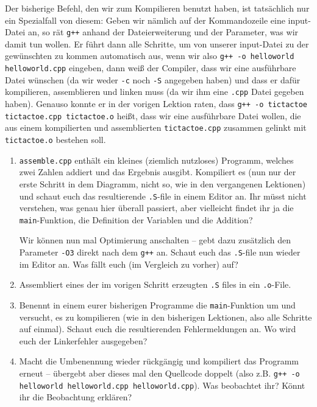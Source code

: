 Der bisherige Befehl, den wir zum Kompilieren benutzt haben, ist tatsächlich
nur ein Spezialfall von diesem: Geben wir nämlich auf der Kommandozeile eine
input-Datei an, so rät \texttt{g++} anhand der Dateierweiterung und der
Parameter, was wir damit tun wollen. Er führt dann alle Schritte, um von
unserer input-Datei zu der gewünschten zu kommen automatisch aus, wenn wir also
\texttt{g++ -o helloworld helloworld.cpp} eingeben, dann weiß der Compiler,
dass wir eine ausführbare Datei wünschen (da wir weder \texttt{-c} noch
\texttt{-S} angegeben haben) und dass er dafür kompilieren, assemblieren und
linken muss (da wir ihm eine \texttt{.cpp} Datei gegeben haben). Genauso konnte
er in der vorigen Lektion raten, dass \texttt{g++ -o tictactoe tictactoe.cpp
    tictactoe.o} heißt, dass wir eine ausführbare Datei wollen, die aus einem
kompilierten und assemblierten \texttt{tictactoe.cpp} zusammen gelinkt mit
\texttt{tictactoe.o} bestehen soll.

\begin{praxis}
    \begin{enumerate}
        \item \texttt{assemble.cpp} enthält ein kleines (ziemlich nutzloses)
              Programm, welches zwei Zahlen addiert und das Ergebnis ausgibt.
              Kompiliert es (nun nur der erste Schritt in dem Diagramm, nicht so, wie
              in den vergangenen Lektionen) und schaut euch das resultierende
              \texttt{.S}-file in einem Editor an. Ihr müsst nicht verstehen,
              was genau hier überall passiert, aber vielleicht findet ihr ja die
              \texttt{main}-Funktion, die Definition der Variablen und die Addition?

              Wir können nun mal Optimierung anschalten -- gebt dazu zusätzlich den
              Parameter \texttt{-O3} direkt nach dem \texttt{g++} an. Schaut euch das
              \texttt{.S}-file nun wieder im Editor an. Was fällt euch
              (im Vergleich zu vorher) auf?
        \item Assembliert eines der im vorigen Schritt erzeugten \texttt{.S} files
              in ein \texttt{.o}-File.
        \item Benennt in einem eurer bisherigen Programme die
              \texttt{main}-Funktion um und versucht, es zu kompilieren (wie in den
              bisherigen Lektionen, also alle Schritte auf einmal). Schaut euch die
              resultierenden Fehlermeldungen an. Wo wird euch der Linkerfehler
              ausgegeben?
        \item Macht die Umbenennung wieder rückgängig und kompiliert das Programm
              erneut -- übergebt aber dieses mal den Quellcode doppelt (also z.B.
              \texttt{g++ -o helloworld helloworld.cpp helloworld.cpp}). Was
              beobachtet ihr? Könnt ihr die Beobachtung erklären?
    \end{enumerate}

\end{praxis}